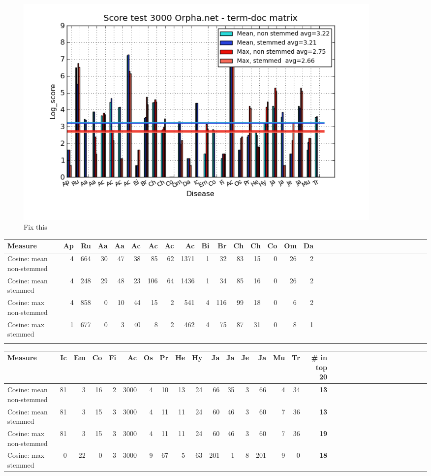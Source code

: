 \begin{figure}[H]
        \begin{center}
          \includegraphics[width=0.9\textwidth]{barcharts/termDoc_orphan_hist_3000_ns_mea_s_mea_ns_max_s_max.png}
        \end{center}
        \caption{Fix this}
        \label{termDoc_orphan_hist_3000_ns_mea_s_mea_ns_max_s_max}
\end{figure}

\begin{table}[H]
\begin{tiny}
  \begin{tabular}{|l|r|r|r|r|r|r|r|r|r|r|r|r|r|r|r|r|r|r|r|r|r|r|r|r|r|r|r|r|r|r|r|}
    \hline
    Measure &Ap&Ru&Aa&Aa&Ac&Ac&Ac&Ac&Bi&Br&Ch&Ch&Co&Om&Da\\
    \hline
    Cosine: mean non-stemmed &4&664&30&47&38&85&62&1371&1&32&83&15&0&26&2\\
    \hline
    Cosine: mean stemmed &4&248&29&48&23&106&64&1436&1&34&85&16&0&26&2\\
    \hline
    Cosine: max non-stemmed &4&858&0&10&44&15&2&541&4&116&99&18&0&6&2\\
    \hline
    Cosine: max stemmed &1&677&0&3&40&8&2&462&4&75&87&31&0&8&1 \\
    \hline
    \multicolumn{16}{c}{} \\
    \end{tabular}
    \begin{tabular}{|l|r|r|r|r|r|r|r|r|r|r|r|r|r|r|r|r|r|r|r|r|r|r|r|r|r|r|r|r|r|r|}
    \hline
     Measure &Ic&Em&Co&Fi&Ac&Os&Pr&He&Hy&Ja&Ja&Je&Ja&Mu&Tr &\scriptsize{\textbf{\# in top 20}} \\
    \hline
    Cosine: mean non-stemmed  &81&3&16&2&3000&4&10&13&24&66&35&3&66&4&34 & \scriptsize{\textbf{13}} \\
    \hline
    Cosine: mean stemmed &81&3&15&3&3000&4&11&11&24&60&46&3&60&7&36 & \scriptsize{\textbf{13}} \\
    \hline
    Cosine: max non-stemmed &81&3&15&3&3000&4&11&11&24&60&46&3&60&7&36 & \scriptsize{\textbf{19}} \\
    \hline
    Cosine: max stemmed &0&22&0&3&3000&9&67&5&63&201&1&8&201&9&0 & \scriptsize{\textbf{18}} \\
    \hline
  \end{tabular}
\end{tiny}
\end{table}

